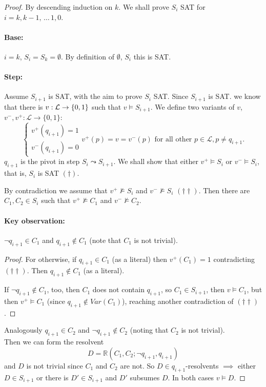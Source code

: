 \begin{proof}
	By descending induction on $k$. We shall prove $S_i$ SAT for $i = k, k-1, \, \dots \, 1 , 0$.

	\paragraph{Base:} $i=k$, $S_i = S_k = \emptyset$. By definition of $\emptyset$, $S_i$ this is SAT.

	\paragraph{Step:} Assume $S_{i+1}$ is SAT, with the aim to prove $S_i$ SAT. Since $S_{i+1}$ is SAT. we know that there is $v: \mathcal{L} \rightarrow \{0,1\}$ such that $v \models S_{i+1}$. We define two variants of $v$, $v^-,v^+: \mathcal{L} \rightarrow \{0,1\}$:
		$$
		\begin{cases}
		  	v^+ (q_{i+1}) = 1 \\
			v^- (q_{i+1}) = 0
		\end{cases}
		v^+ (p) = v = v^- (p) \text{ for all other } p \in \mathcal{L}, p \neq q_{i+1}.
		$$
	$q_{i+1}$ is the pivot in step $S_{i} \leadsto S_{i+1}$. We shall show that either $v^+ \models S_i$ or $v^- \models S_i$, that is, $S_i$ is SAT $(\dag)$.

	By contradiction we assume that $v^+ \not \models S_i$ and $v^- \not \models S_i$ $(\dag \dag)$. Then there are $C_1, C_2 \in S_i$ such that $v^+ \not \models C_1$ and $v^- \not \models C_2$.
	\paragraph{Key observation:} $\neg q_{i+1} \in C_1$ and $q_{i+1} \notin C_1$ (note that $C_1$ is not trivial).
	\begin{proof}
	For otherwise, if $q_{i+1} \in C_1$ (as a literal) then $v^+(C_1) = 1$ contradicting $(\dag \dag)$. Then $q_{i+1} \notin C_1$ (as a literal).

	If $\neg q_{i+1} \notin C_1$, too, then $C_1$ does not contain $q_{i+1}$, so $C_1 \in S_{i+1}$, then $v \models C_1$, but then $v^+ \models C_1$ (since $q_{i+1} \notin Var (C_1)$), reaching another contradiction of $(\dag \dag)$.
	\end{proof}

	\noindent
	Analogously $q_{i+1} \in C_2$ and $\neg q_{i+1} \notin C_2$ (noting that $C_2$ is not trivial).\\

	Then we can form the resolvent
	$$ D = \mathbb{R} (C_1, C_2; \neg q_{i+1}, q_{i+1}) $$
	and $D$ is not trivial since $C_1$ and $C_2$ are not. So $D \in q_{i+1}$-resolvents $\implies$ either $D \in S_{i+1}$ or there is $D' \in S_{i+1}$ and $D'$ subsumes $D$. In both cases $v \models D$.


\end{proof}
